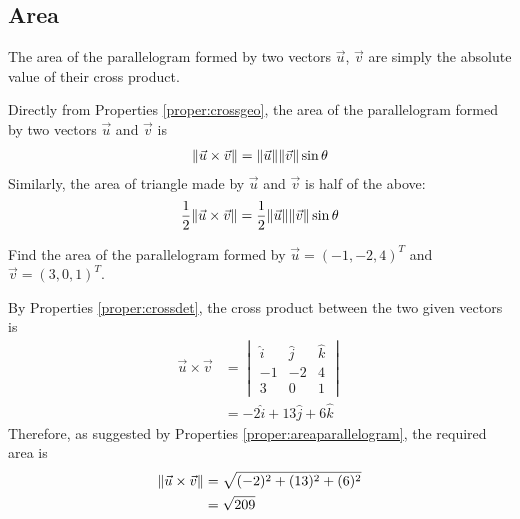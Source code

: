 \subsection{Area}
The area of the parallelogram formed by two vectors $\vec{u}$, $\vec{v}$ are simply the absolute value of their cross product.
\begin{center}
\end{center}
\begin{proper}
\label{proper:areaparallelogram}
Directly from Properties \ref{proper:crossgeo}, the area of the parallelogram formed by two vectors $\vec{u}$ and $\vec{v}$ is
\begin{align*}
\norm{\vec{u} \times \vec{v}} = \norm{\vec{u}}\norm{\vec{v}}\sin\theta
\end{align*}
Similarly, the area of triangle made by $\vec{u}$ and $\vec{v}$ is half of the above:
\begin{align*}
\frac{1}{2}\norm{\vec{u} \times \vec{v}} = \frac{1}{2}\norm{\vec{u}}\norm{\vec{v}}\sin\theta   
\end{align*}
\end{proper}

\begin{exmp}
Find the area of the parallelogram formed by $\vec{u} = (-1, -2, 4)^T$ and $\vec{v} = (3, 0, 1)^T$.
\end{exmp}
\begin{solution}
By Properties \ref{proper:crossdet}, the cross product between the two given vectors is
\begin{align*}
\vec{u} \times \vec{v} &=
\begin{vmatrix}
\hat{i} & \hat{j} & \hat{k} \\
-1 & -2 & 4 \\
3 & 0 & 1
\end{vmatrix} \\
&= -2\hat{i} + 13\hat{j} + 6\hat{k}
\end{align*}
Therefore, as suggested by Properties \ref{proper:areaparallelogram}, the required area is
\begin{align*}
\norm{\vec{u} \times \vec{v}} &= \sqrt{(-2)^2 + (13)^2 + (6)^2} \\
&= \sqrt{209}
\end{align*}
\end{solution}


